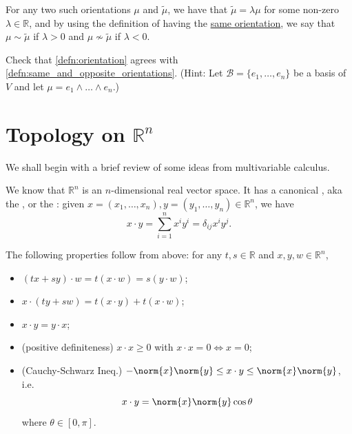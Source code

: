 \documentclass[notoc,notitlepage]{tufte-book}
\begin{document}
\begin{note}
  For any two such orientations $\mu$ and $\tilde{\mu}$, we have that
  $\tilde{\mu} = \lambda \mu$ for some non-zero $\lambda \in \mathbb{R}$, and by using
  the definition of having the \hyperref[defn:same_and_opposite_orientations]{same orientation},
  we say that $\mu \sim \tilde{\mu}$ if $\lambda > 0$ and $\mu \not\sim \tilde{\mu}$ if
  $\lambda < 0$.
\end{note}

\begin{ex}
  Check that \cref{defn:orientation} agrees with \cref{defn:same_and_opposite_orientations}.
  (Hint: Let $\mathcal{B} = \{ e_1, \ldots, e_n \}$ be a basis of $V$ and let
  $\mu = e_1 \land \hdots \land e_n$.)
\end{ex}


\section{Topology on \texorpdfstring{$\mathbb{R}^n$}{Rn}}%
\label{sec:topology_on_r_n_}

We shall begin with a brief review of some ideas from multivariable calculus.

We know that $\mathbb{R}^n$ is an $n$-dimensional real vector space. It has a canonical
 , aka the ,
or the : given
$x = (x_1, \ldots, x_n), y = (y_1, \ldots, y_n) \in \mathbb{R}^n$, we have
\begin{equation*}
  x \cdot y = \sum_{i=1}^{n} x^i y^i = \delta_{ij} x^i y^j.
\end{equation*}

The following properties follow  from above: for any $t, s \in \mathbb{R}$ and
$x, y , w\in \mathbb{R}^n$,
\begin{itemize}
  \item $(tx + sy) \cdot w = t ( x \cdot w ) = s(y \cdot w)$;
  \item $x \cdot (ty + sw) = t(x \cdot y) + t(x \cdot w)$;
  \item $x \cdot y = y \cdot x$;
  \item (positive definiteness) $x \cdot x \geq 0$ with $x \cdot x = 0 \iff x = 0$;
  \item (Cauchy-Schwarz Ineq.) $-\norm{x} \norm{y} \leq x \cdot y \leq \norm{x} \norm{y}$,
    i.e.
    \begin{equation*}
      x \cdot y = \norm{x} \norm{y} \cos \theta
    \end{equation*}
    where $\theta \in [0, \pi]$.
\end{itemize}
\end{document}
